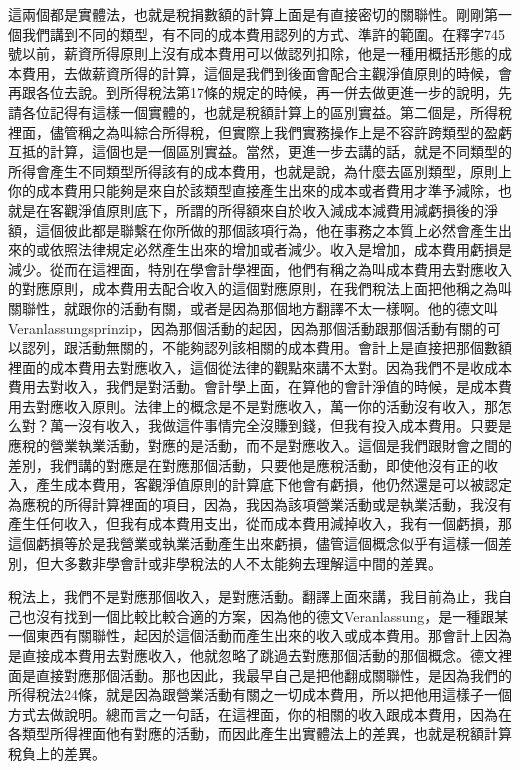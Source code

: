 \documentclass[oneside,sub3section]{ctexbook}
\begin{document}
這兩個都是實體法，也就是稅捐數額的計算上面是有直接密切的關聯性。剛剛第一個我們講到不同的類型，有不同的成本費用認列的方式、準許的範圍。在釋字745號以前，薪資所得原則上沒有成本費用可以做認列扣除，他是一種用概括形態的成本費用，去做薪資所得的計算，這個是我們到後面會配合主觀淨值原則的時候，會再跟各位去說。到所得稅法第17條的規定的時候，再一併去做更進一步的說明，先請各位記得有這樣一個實體的，也就是稅額計算上的區別實益。第二個是，所得稅裡面，儘管稱之為叫綜合所得稅，但實際上我們實務操作上是不容許跨類型的盈虧互抵的計算，這個也是一個區別實益。當然，更進一步去講的話，就是不同類型的所得會產生不同類型所得該有的成本費用，也就是說，為什麼去區別類型，原則上你的成本費用只能夠是來自於該類型直接產生出來的成本或者費用才準予減除，也就是在客觀淨值原則底下，所謂的所得額來自於收入減成本減費用減虧損後的淨額，這個彼此都是聯繫在你所做的那個該項行為，他在事務之本質上必然會產生出來的或依照法律規定必然產生出來的增加或者減少。收入是增加，成本費用虧損是減少。從而在這裡面，特別在學會計學裡面，他們有稱之為叫成本費用去對應收入的對應原則，成本費用去配合收入的這個對應原則，在我們稅法上面把他稱之為叫關聯性，就跟你的活動有關，或者是因為那個地方翻譯不太一樣啊。他的德文叫Veranlassungsprinzip，因為那個活動的起因，因為那個活動跟那個活動有關的可以認列，跟活動無關的，不能夠認列該相關的成本費用。會計上是直接把那個數額裡面的成本費用去對應收入，這個從法律的觀點來講不太對。因為我們不是收成本費用去對收入，我們是對活動。會計學上面，在算他的會計淨值的時候，是成本費用去對應收入原則。法律上的概念是不是對應收入，萬一你的活動沒有收入，那怎么對？萬一沒有收入，我做這件事情完全沒賺到錢，但我有投入成本費用。只要是應稅的營業執業活動，對應的是活動，而不是對應收入。這個是我們跟財會之間的差別，我們講的對應是在對應那個活動，只要他是應稅活動，即使他沒有正的收入，產生成本費用，客觀淨值原則的計算底下他會有虧損，他仍然還是可以被認定為應稅的所得計算裡面的項目，因為，我因為該項營業活動或是執業活動，我沒有產生任何收入，但我有成本費用支出，從而成本費用減掉收入，我有一個虧損，那這個虧損等於是我營業或執業活動產生出來虧損，儘管這個概念似乎有這樣一個差別，但大多數非學會計或非學稅法的人不太能夠去理解這中間的差異。

稅法上，我們不是對應那個收入，是對應活動。翻譯上面來講，我目前為止，我自己也沒有找到一個比較比較合適的方案，因為他的德文Veranlassung，是一種跟某一個東西有關聯性，起因於這個活動而產生出來的收入或成本費用。那會計上因為是直接成本費用去對應收入，他就忽略了跳過去對應那個活動的那個概念。德文裡面是直接對應那個活動。那也因此，我最早自己是把他翻成關聯性，是因為我們的所得稅法24條，就是因為跟營業活動有關之一切成本費用，所以把他用這樣子一個方式去做說明。總而言之一句話，在這裡面，你的相關的收入跟成本費用，因為在各類型所得裡面他有對應的活動，而因此產生出實體法上的差異，也就是稅額計算稅負上的差異。
\end{document}
